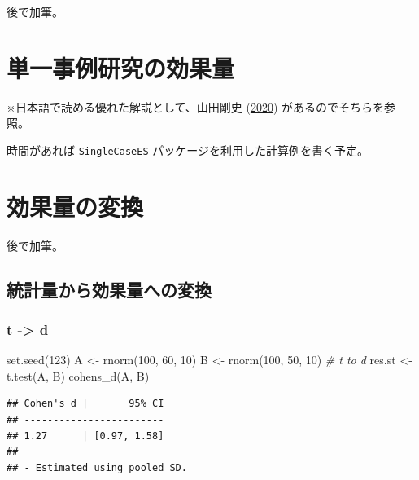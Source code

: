 \documentclass[
  ja=standard, xelatex, base=12pt]{bxjsreport}
\newenvironment{Shaded}{\begin{snugshade}}{\end{snugshade}}
\newcommand{\CommentTok}[1]{\textcolor[rgb]{0.56,0.35,0.01}{\textit{#1}}}
\newcommand{\DecValTok}[1]{\textcolor[rgb]{0.00,0.00,0.81}{#1}}
\newcommand{\FunctionTok}[1]{\textcolor[rgb]{0.00,0.00,0.00}{#1}}
\newcommand{\NormalTok}[1]{#1}
\newcommand{\OtherTok}[1]{\textcolor[rgb]{0.56,0.35,0.01}{#1}}
\begin{document}
後で加筆。

\hypertarget{ux5358ux4e00ux4e8bux4f8bux7814ux7a76ux306eux52b9ux679cux91cf}{%
\chapter{単一事例研究の効果量}\label{ux5358ux4e00ux4e8bux4f8bux7814ux7a76ux306eux52b9ux679cux91cf}}

※日本語で読める優れた解説として、山田剛史 (\protect\hyperlink{ref-ux5c71ux75302020}{2020}) があるのでそちらを参照。

時間があれば \texttt{SingleCaseES} パッケージを利用した計算例を書く予定。

\hypertarget{ux52b9ux679cux91cfux306eux5909ux63db}{%
\chapter{効果量の変換}\label{ux52b9ux679cux91cfux306eux5909ux63db}}

後で加筆。

\hypertarget{ux7d71ux8a08ux91cfux304bux3089ux52b9ux679cux91cfux3078ux306eux5909ux63db}{%
\section{統計量から効果量への変換}\label{ux7d71ux8a08ux91cfux304bux3089ux52b9ux679cux91cfux3078ux306eux5909ux63db}}

\hypertarget{t---d}{%
\subsection{t -\textgreater{} d}\label{t---d}}

\begin{Shaded}
\begin{Highlighting}[]
\FunctionTok{set.seed}\NormalTok{(}\DecValTok{123}\NormalTok{)}
\NormalTok{A }\OtherTok{\textless{}{-}} \FunctionTok{rnorm}\NormalTok{(}\DecValTok{100}\NormalTok{, }\DecValTok{60}\NormalTok{, }\DecValTok{10}\NormalTok{)}
\NormalTok{B }\OtherTok{\textless{}{-}} \FunctionTok{rnorm}\NormalTok{(}\DecValTok{100}\NormalTok{, }\DecValTok{50}\NormalTok{, }\DecValTok{10}\NormalTok{)}
\CommentTok{\# t to d}
\NormalTok{res.st }\OtherTok{\textless{}{-}} \FunctionTok{t.test}\NormalTok{(A, B)}
\FunctionTok{cohens\_d}\NormalTok{(A, B)}
\end{Highlighting}
\end{Shaded}

\begin{verbatim}
## Cohen's d |       95% CI
## ------------------------
## 1.27      | [0.97, 1.58]
## 
## - Estimated using pooled SD.
\end{verbatim}
\end{document}
